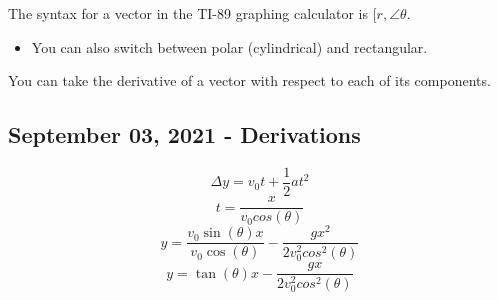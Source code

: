 \documentclass[../main.tex]{subfiles}
\begin{document}
\begin{remark}
  The syntax for a vector in the TI-89 graphing calculator is 
  $[r,\angle \theta $. 

  \begin{itemize}
    \item You can also switch between polar (cylindrical) and rectangular.
  \end{itemize}
\end{remark}

\begin{remark}
  You can take the derivative of a vector with respect to each of its components.
\end{remark}

\subsection{September 03, 2021 - Derivations}

\begin{example}
  $$\Delta y = v_0t + \frac{1}{2}at^2$$
  $$t = \frac{x}{v_0cos(\theta)}$$
  $$y = \frac{v_0\sin(\theta)x}{v_0\cos(\theta)} - \frac{gx^2}{2v_0^2cos^2(\theta)}$$
  $$y = \tan(\theta)x - \frac{gx}{2v_0^2cos^2(\theta)}$$
\end{example}
\end{document}

